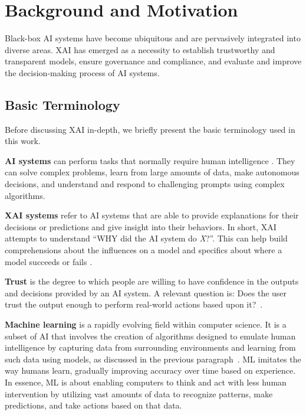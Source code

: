 \documentclass[final,5p,times,twocolumn]{elsarticle}
\begin{document}
\section{Background and Motivation} \label{sectionBackground}
Black-box AI systems have become ubiquitous and are pervasively integrated into diverse areas. XAI has emerged as a necessity to establish trustworthy and transparent models, ensure governance and compliance, and evaluate and improve the decision-making process of AI systems. 

\subsection{Basic Terminology}
Before discussing XAI in-depth, we briefly present the basic terminology used in this work.

\textbf{AI systems} can perform tasks that normally require human intelligence \cite{bostrom2018ethics}. They can solve complex problems, learn from large amounts of data, make autonomous decisions, and understand and respond to challenging prompts using complex algorithms.

\textbf{XAI systems} refer to AI systems that are able to provide explanations for their decisions or predictions and give insight into their behaviors. In short, XAI attempts to understand ``WHY did the AI system do \textit{X}?''. This can help build	comprehensions about the influences on a model and	specifics about where a model succeeds or fails \cite{minh2022explainable}.

\textbf{Trust} is the degree to which people are willing to have confidence in the outputs and decisions provided by an AI system. A relevant question is: Does the user trust the output enough to perform real-world actions based upon it?~\cite{ribeiro2016should}.



\textbf{Machine learning} is a rapidly evolving field within computer science. It is a subset of AI that involves the creation of algorithms designed to emulate human intelligence by capturing data from surrounding environments and learning from such data using models, as discussed in the previous paragraph~\cite{el2015machine}. ML imitates the way humans learn, gradually improving accuracy over time based on experience. In essence, ML is about enabling computers to think and act with less human intervention by utilizing vast amounts of data to recognize patterns, make predictions, and take actions based on that data.
\end{document}

